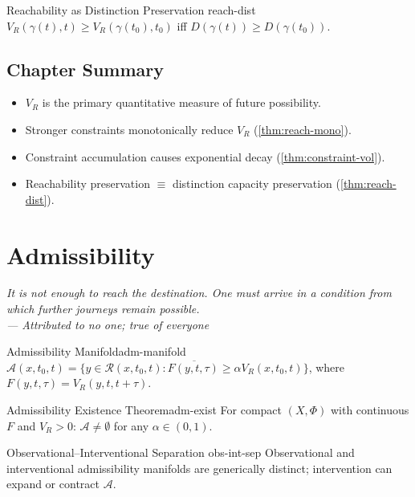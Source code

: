 \documentclass[12pt,twoside,openright]{book}
\newcommand{\reach}{\mathcal{R}}
\newcommand{\adm}{\mathcal{A}}
\newenvironment{epigraph}[2]{%
  \vspace{1em}\begin{flushright}
  \begin{minipage}{0.72\textwidth}
  \itshape\small #1\\[0.4em]
  \upshape\footnotesize\sffamily\color{DistGray}--- #2
  \end{minipage}\end{flushright}\vspace{1.5em}}{}
\newenvironment{chapsummary}{%
  \begin{tcolorbox}[colback=DistBlue!5,colframe=DistBlue,
    title={\faBookOpen\enspace Summary},
    fonttitle=\sffamily\bfseries\color{white},
    attach boxed title to top left={yshift=-2mm,xshift=4mm},
    boxed title style={colback=DistBlue,rounded corners}]
  \begin{itemize}[nosep,leftmargin=*]}{%
  \end{itemize}\end{tcolorbox}}
\begin{document}
\begin{theorem}{Reachability as Distinction Preservation}%
  {reach-dist}
  $V_R(\gamma(t),t)\ge V_R(\gamma(t_0),t_0)$ iff
  $D(\gamma(t))\ge D(\gamma(t_0))$.
\end{theorem}

\section*{Chapter Summary}
\begin{chapsummary}
  \item $V_R$ is the primary quantitative measure of future
        possibility.
  \item Stronger constraints monotonically reduce $V_R$
        (\cref{thm:reach-mono}).
  \item Constraint accumulation causes exponential decay
        (\cref{thm:constraint-vol}).
  \item Reachability preservation $\equiv$ distinction
        capacity preservation (\cref{thm:reach-dist}).
\end{chapsummary}

\chapter{Admissibility}
\label{ch:admissibility}
\begin{epigraph}{It is not enough to reach the destination.
  One must arrive in a condition from which further journeys
  remain possible.}{Attributed to no one; true of everyone}
\end{epigraph}

\begin{definition}{Admissibility Manifold}{adm-manifold}
  $\adm(x,t_0,t)=\overline{\{y\in\reach(x,t_0,t):
  F(y,t,\tau)\ge\alpha V_R(x,t_0,t)\}}$,
  where $F(y,t,\tau)=V_R(y,t,t+\tau)$.
\end{definition}

\begin{theorem}{Admissibility Existence Theorem}{adm-exist}
  For compact $(X,\Phi)$ with continuous $F$ and
  $V_R>0$: $\adm\ne\emptyset$ for any $\alpha\in(0,1)$.
\end{theorem}

\begin{theorem}{Observational--Interventional Separation}%
  {obs-int-sep}
  Observational and interventional admissibility manifolds
  are generically distinct; intervention can expand or
  contract $\adm$.
  \parencite{pearl2000causality,spirtes2000}
\end{theorem}
\end{document}
